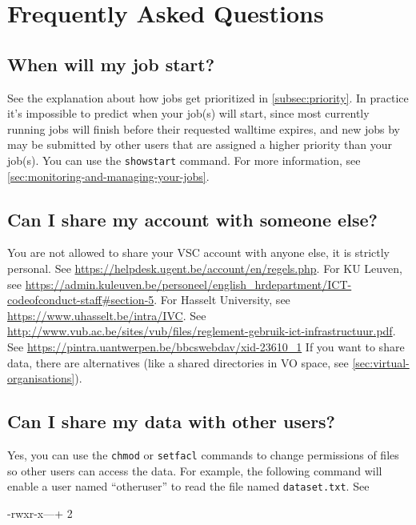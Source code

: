 \chapter{Frequently Asked Questions}
\label{ch:faq}

\section{When will my job start?}

\ifgent
See the explanation about how jobs get prioritized in \autoref{subsec:priority}.
\else
\ifbrussel
In practice it's impossible to predict when your job(s) will start,
since most currently running jobs will finish before their requested walltime
expires, and new jobs by may be submitted by other users that are assigned a higher
priority than your job(s).
\else
You can use the \lstinline|showstart| command. For more information, see \autoref{sec:monitoring-and-managing-your-jobs}.
\fi %
\fi %

\section{Can I share my account with someone else?}

 You are not allowed to share your VSC account with anyone else, it is strictly personal.
\ifgent
See \url{https://helpdesk.ugent.be/account/en/regels.php}.
\fi
\ifleuven
For KU Leuven, see \url{https://admin.kuleuven.be/personeel/english_hrdepartment/ICT-codeofconduct-staff#section-5}.
For Hasselt University, see \url{https://www.uhasselt.be/intra/IVC}.
\fi
\ifbrussel
See \url{http://www.vub.ac.be/sites/vub/files/reglement-gebruik-ict-infrastructuur.pdf}.
\fi
\ifantwerpen
See \url{https://pintra.uantwerpen.be/bbcswebdav/xid-23610_1}
\fi
\ifgent
If you want to share data, there are alternatives (like a shared
directories in VO space, see \autoref{sec:virtual-organisations}).
\fi

\section{Can I share my data with other \hpc users?}

Yes, you can use the \lstinline|chmod| or \lstinline|setfacl| commands to change permissions
of files so other users can access the data. For example, the following command
will enable a user named ``otheruser'' to read the file named \lstinline|dataset.txt|.
See

\begin{prompt}
-rwxr-x---+ 2 %
\end{prompt}

